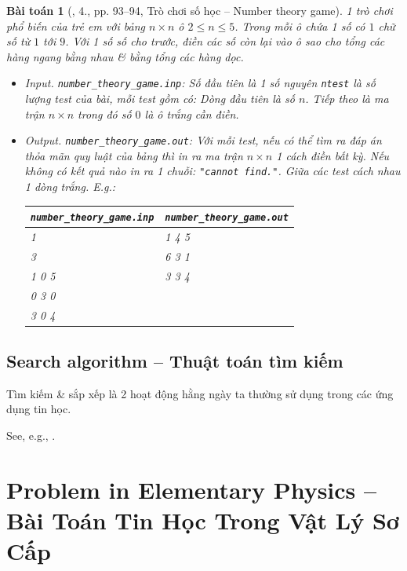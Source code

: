 \documentclass{article}
\newtheorem{baitoan}{Bài toán}
\begin{document}
\begin{baitoan}[\cite{VietSTEM2021}, 4., pp. 93--94, Trò chơi số học -- Number theory game]
	1 trò chơi phổ biến của trẻ em với bảng $n\times n$ ô $2\le n\le5$. Trong mỗi ô chứa 1 số có $1$ chữ số từ $1$ tới $9$. Với 1 số số cho trước, điền các số còn lại vào ô sao cho tổng các hàng ngang bằng nhau \& bằng tổng các hàng dọc.
	\begin{itemize}
		\item {\sf Input.} \verb|number_theory_game.inp|: Số đầu tiên là 1 số nguyên {\tt ntest} là số lượng test của bài, mỗi test gồm có: Dòng đầu tiên là số $n$. Tiếp theo là ma trận $n\times n$ trong đó số $0$ là ô trắng cần điền.		
		\item {\sf Output.} \verb|number_theory_game.out|: Với mỗi test, nếu có thể tìm ra đáp án thỏa mãn quy luật của bảng thì in ra ma trận $n\times n$ 1 cách điền bất kỳ. Nếu không có kết quả nào in ra 1 chuỗi: {\tt "cannot find."}. Giữa các test cách nhau 1 dòng trắng. E.g.:
		\begin{table}[H]
			\centering
			\begin{tabular}{|l|l|}
				\hline
				\verb|number_theory_game.inp| & \verb|number_theory_game.out| \\
				\hline
				1 & 1 4 5 \\
				3 & 6 3 1 \\
				1 0 5 & 3 3 4 \\
				0 3 0 & \\
				3 0 4 & \\
				\hline
			\end{tabular}
		\end{table}		
	\end{itemize}
\end{baitoan}
	

\subsection{Search algorithm -- Thuật toán tìm kiếm}
Tìm kiếm \& sắp xếp là 2 hoạt động hằng ngày ta thường sử dụng trong các ứng dụng tin học.

See, e.g., \cite[Chap. 6: Searching]{Knuth1998}.


\section{Problem in Elementary Physics -- Bài Toán Tin Học Trong Vật Lý Sơ Cấp}
\end{document}
